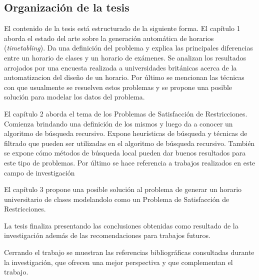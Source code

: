 \begin{introduction}
\section*{Organización de la tesis}

El contenido de la tesis está estructurado de la siguiente forma. El cap\'itulo 1 aborda el estado del arte sobre la generaci\'on autom\'atica de horarios (\emph{timetabling}). Da una definici\'on del problema y explica las principales diferencias entre un horario de clases y un horario de ex\'amenes. Se analizan los resultados arrojados por una encuesta realizada a universidades brit\'anicas acerca de la automatizacion del diseño de un horario. Por \'ultimo se mencionan las t\'ecnicas con que usualmente se resuelven estos problemas y se propone una posible soluci\'on para modelar los datos del problema.

El cap\'itulo 2 aborda el tema de los Problemas de Satisfacci\'on de Restricciones. Comienza brindando una definici\'on de los mismos y luego da a conocer un algoritmo de b\'usqueda recursivo. Expone heur\'isticas de b\'usqueda y t\'ecnicas de filtrado que pueden ser utilizadas en el algoritmo de b\'usqueda recursivo. Tambi\'en se expone c\'omo m\'etodos de b\'usqueda local pueden dar buenos resultados para este tipo de problemas. Por \'ultimo se hace referencia a trabajos realizados en este campo de investigaci\'on 

El cap\'itulo 3 propone una posible soluci\'on al problema de generar un horario universitario de clases modelandolo como un Problema de Satisfacci\'on de Restricciones.

La tesis finaliza presentando las conclusiones obtenidas como resultado de la investigación además de las recomendaciones para trabajos futuros.

Cerrando el trabajo se muestran las referencias bibliográficas consultadas durante la investigación, que ofrecen una mejor perspectiva y que complementan el trabajo.

\end{introduction}
